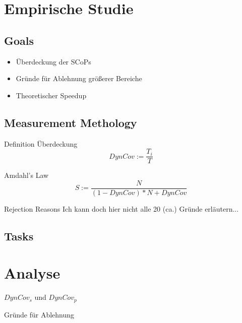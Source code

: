 \documentclass[aspectratio=169, xcolor=dvipsnames]{beamer}
\begin{document}
\section{Empirische Studie}
\subsection{Goals}
\begin{frame}{\subsecname}
    \begin{itemize}
        \item Überdeckung der SCoPs
        \item Gründe für Ablehnung größerer Bereiche
        \item Theoretischer Speedup
    \end{itemize}
\end{frame}
\subsection{Measurement Methology}
\begin{frame}{Definition Überdeckung}
    \Huge{\[DynCov := \frac{T_i}{T}\]}
\end{frame}
\begin{frame}{Amdahl's Law}
    \Huge{\[S := \frac{N}{(1-DynCov)*N+DynCov}\]}
\end{frame}
\begin{frame}{Rejection Reasons}
    Ich kann doch hier nicht alle 20 (ca.) Gründe erläutern...
\end{frame}
\subsection{Tasks}

\section{Analyse}
\begin{frame}{\(DynCov_s\) und \(DynCov_p\)}
    \begin{figure}[!h]
        
    \end{figure}
\end{frame}
\begin{frame}{Gründe für Ablehnung}
    \begin{figure}[!h]
        
     \end{figure}
\end{frame}
\end{document}
